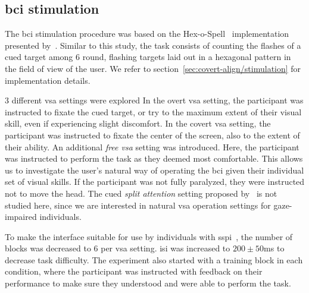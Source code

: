 \subsection{\Ac{bci} stimulation}

The \ac{bci} stimulation procedure was based on the
Hex-o-Spell~\cite{Treder2010} implementation presented
by~\textcite{VanDenKerchove2024}.
Similar to this study, the task consists of counting the flashes of a cued
target among 6 round, flashing targets laid out in a hexagonal pattern in the
field of view of the user.
We refer to section~\ref{sec:covert-align/stimulation} for implementation details.

3 different \ac{vsa} settings were explored
In the overt \ac{vsa} setting, the participant was instructed to fixate the cued target, or
try to the maximum extent of their visual skill, even if experiencing slight
discomfort.
In the covert \ac{vsa} setting, the participant was instructed to fixate the center of the
screen, also to the extent of their ability.
An additional \emph{free \ac{vsa}} setting was introduced.
Here, the participant was instructed to perform the task as they deemed most
comfortable.
This allows us to investigate the user's natural way of operating the \ac{bci}
given their individual set of visual skills.
If the participant was not fully paralyzed, they were instructed not to move the head.
The cued \emph{split attention} setting proposed
by~\textcite{VanDenKerchove2024} is not studied here, since we are interested
in natural \ac{vsa} operation settings for gaze-impaired individuals.

To make the interface suitable for use by individuals with
\ac{sspi}~\cite{FriedOken2020}, the
number of blocks was decreased to 6 per \ac{vsa} setting.
\Ac{isi} was increased to $200\pm50$ms to decrease task difficulty.
The experiment also started with a training block in each condition, where the
participant was instructed with feedback on their performance to make sure they
understood and were able to perform the task.

